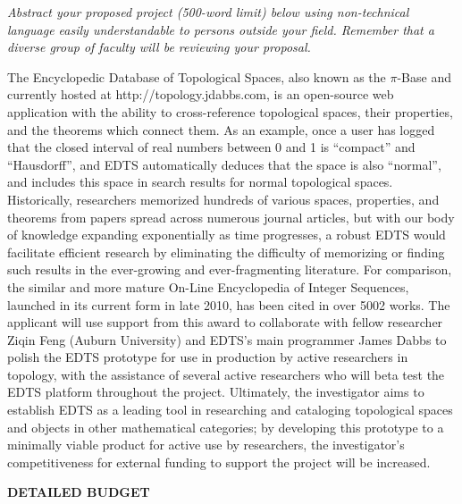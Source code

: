\documentclass[10pt]{article}
\begin{document}
\textit{Abstract your proposed project (500-word limit) below using non-technical language easily understandable to persons outside your field.  Remember that a diverse group of faculty will be reviewing your proposal.}\vspace{2em}

The Encyclopedic Database of Topological Spaces, also known as the \(\pi\)-Base and currently hosted at http://topology.jdabbs.com, is an open-source web application with the ability to cross-reference topological spaces, their properties, and the theorems which connect them. As an example, once a user has logged that the closed interval of real numbers between 0 and 1 is ``compact'' and ``Hausdorff'', and EDTS automatically deduces that the space is also ``normal'', and includes this space in search results for normal topological spaces. Historically, researchers memorized hundreds of various spaces, properties, and theorems from papers spread across numerous journal articles, but with our body of knowledge expanding exponentially as time progresses, a robust EDTS would facilitate efficient research by eliminating the difficulty of memorizing or finding such results in the ever-growing and ever-fragmenting literature. For comparison, the similar and more mature On-Line Encyclopedia of Integer Sequences, launched in its current form in late 2010, has been cited in over 5002 works. The applicant will use support from this award to collaborate with fellow researcher Ziqin Feng (Auburn University) and EDTS's main programmer James Dabbs to polish the EDTS prototype for use in production by active researchers in topology, with the assistance of several active researchers who will beta test the EDTS platform throughout the project. Ultimately, the investigator aims to establish EDTS as a leading tool in researching and cataloging topological spaces and objects in other mathematical categories; by developing this prototype to a minimally viable product for active use by researchers, the investigator’s competitiveness for external funding to support the project will be increased.

\newpage

\centerline{\bf\Large
DETAILED BUDGET
}
\end{document}

